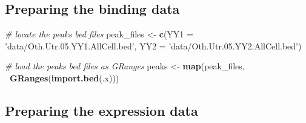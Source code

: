 \documentclass[9pt,a4paper,]{extarticle}
\newenvironment{Shaded}{\begin{snugshade}}{\end{snugshade}}
\newcommand{\CommentTok}[1]{\textcolor[rgb]{0.56,0.35,0.01}{\textit{#1}}}
\newcommand{\DataTypeTok}[1]{\textcolor[rgb]{0.13,0.29,0.53}{#1}}
\newcommand{\DecValTok}[1]{\textcolor[rgb]{0.00,0.00,0.81}{#1}}
\newcommand{\KeywordTok}[1]{\textcolor[rgb]{0.13,0.29,0.53}{\textbf{#1}}}
\newcommand{\NormalTok}[1]{#1}
\newcommand{\OperatorTok}[1]{\textcolor[rgb]{0.81,0.36,0.00}{\textbf{#1}}}
\newcommand{\OtherTok}[1]{\textcolor[rgb]{0.56,0.35,0.01}{#1}}
\newcommand{\StringTok}[1]{\textcolor[rgb]{0.31,0.60,0.02}{#1}}
\begin{document}
\hypertarget{preparing-the-binding-data}{%
\subsection{Preparing the binding data}\label{preparing-the-binding-data}}

\begin{Shaded}
\begin{Highlighting}[]
\CommentTok{# locate the peaks bed files}
\NormalTok{peak_files <-}\StringTok{ }\KeywordTok{c}\NormalTok{(}\DataTypeTok{YY1 =} \StringTok{'data/Oth.Utr.05.YY1.AllCell.bed'}\NormalTok{,}
                \DataTypeTok{YY2 =} \StringTok{'data/Oth.Utr.05.YY2.AllCell.bed'}\NormalTok{)}

\CommentTok{# load the peaks bed files as GRanges}
\NormalTok{peaks <-}\StringTok{ }\KeywordTok{map}\NormalTok{(peak_files, }\OperatorTok{~}\KeywordTok{GRanges}\NormalTok{(}\KeywordTok{import.bed}\NormalTok{(.x)))}
\end{Highlighting}
\end{Shaded}

\hypertarget{preparing-the-expression-data}{%
\subsection{Preparing the expression data}\label{preparing-the-expression-data}}

\begin{Shaded}
\end{Shaded}
\end{document}
